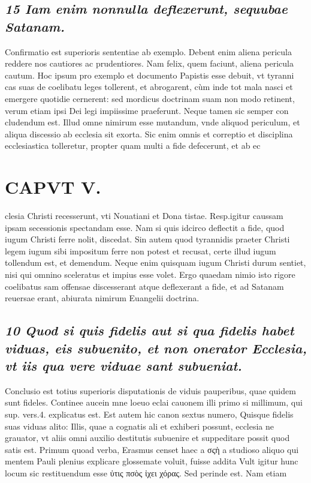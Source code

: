 \documentclass{article}
\begin{document}
\begin{pages}
\subsection*{\textit{15 Iam enim nonnulla deflexerunt, sequubae Satanam. }}\pstart Confirmatio est superioris sententiae ab exemplo. Debent enim aliena pericula reddere nos cautiores ac prudentiores. Nam felix, quem faciunt, aliena pericula cautum. Hoc ipsum pro exemplo et documento Papistis esse debuit, vt tyranni cas suas de coelibatu leges tollerent, et abrogarent, cùm inde tot mala nasci et emergere quotidie cernerent: sed mordicus doctrinam suam non modo retinent, verum etiam ipsi Dei legi impiissime praeferunt. Neque tamen sic semper con cludendum est. Illud omne nimirum esse mutandum, vnde aliquod periculum, et aliqua discessio ab ecclesia sit exorta. Sic enim omnis et correptio et disciplina ecclesiastica tolleretur, propter quam multi a fide defecerunt, et ab ec\pend
\section*{CAPVT  V. }
\marginpar{[ p.301 ]}\pstart clesia Christi recesserunt, vti Nouatiani et Dona tistae. Resp.igitur caussam ipsam secessionis spectandam esse. Nam si quis idcirco deflectit a fide, quod iugum Christi ferre nolit, discedat. Sin autem quod tyrannidis praeter Christi legem iugum sibi impositum ferre non potest et recusat, certe illud iugum tollendum est, et demendum. Neque enim quisquam iugum Christi durum sentiet, nisi qui omnino sceleratus et impius esse volet. Ergo quaedam nimio isto rigore coelibatus sam offensae discesserant atque deflexerant a fide, et ad Satanam reuersae erant, abiurata nimirum Euangelii doctrina.  \pend
{}
{}
\subsection*{\textit{10 Quod si quis fidelis aut si qua fidelis habet viduas, eis subuenito, et non onerator Ecclesia, vt iis qua vere viduae sant subueniat. }}\pstart Conclusio est totius superioris disputationis de viduis pauperibus, quae quidem sunt fideles. Continee aucein mne loeuo eclai cauonem illi primo si millimum, qui sup. vers.4. explicatus est. Est autem hic canon sextus numero, Quisque fidelis suas viduas alito: Illis, quae a cognatis ali et exhiberi possunt, ecclesia ne grauator, vt aliis omni auxilio destitutis subuenire et suppeditare possit quod satis est.  \pend\pstart Primum quoad verba, Erasmus censet haec a σςὴ a studioso aliquo qui mentem Pauli plenius explicare glossemate voluit, fuisse addita Vult igitur hunc locum sic restituendum esse ὐτις πσὸς ἰχει χόρας. Sed perinde est. Nam etiam  \pend

\end{pages}
\end{document}
